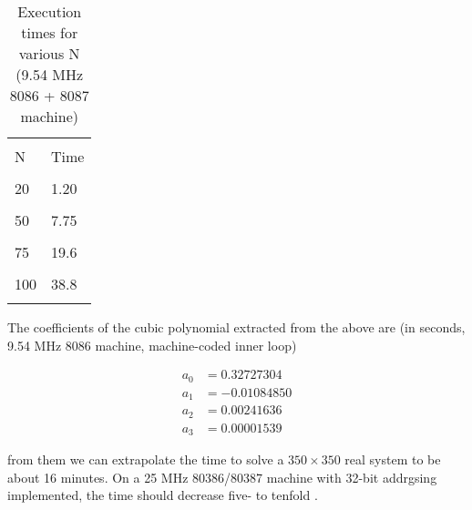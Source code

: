 \begin{table}
    \centering
    \caption{Execution times for various N (9.54 MHz 8086 + 8087 machine)}
        \bigskip
    \label{tbl:09_01} 
    \setlength{\tabcolsep}{40pt}
        \begin{tabular}{|ll|}
            \hline & \\
            N   &  Time\\
            & \\
            20  &  1.20\\
            & \\
            50  &  7.75\\
            & \\
            75  &  19.6\\
            & \\
            100 &  38.8\\
            & \\
            \hline
        \end{tabular}
\end{table}

The coefficients of the cubic polynomial extracted from the above
are (in seconds, 9.54 MHz 8086 machine, machine-coded inner loop)

\begin{equation*}
    \begin{split}
        a_0 &= 0.32727304\\
        a_1 &= -0.01084850\\
        a_2 &= 0.00241636\\
        a_3 &= 0.00001539
    \end{split}
\end{equation*}

from them we can extrapolate the time to solve a $350 \times 350$ real
system to be about 16 minutes. On a 25 MHz 80386/80387 machine with 32-bit addrgsing implemented, the time should
decrease five- to tenfold .

